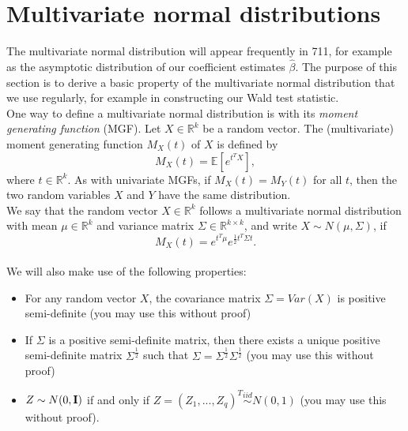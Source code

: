 \documentclass[11pt]{article}
\begin{document}
\section*{Multivariate normal distributions}

\noindent The multivariate normal distribution will appear frequently in 711, for example as the asymptotic distribution of our coefficient estimates $\widehat{\beta}$. The purpose of this section is to derive a basic property of the multivariate normal distribution that we use regularly, for example in constructing our Wald test statistic.\\


\noindent One way to define a multivariate normal distribution is with its \textit{moment generating function} (MGF).  Let $X \in \mathbb{R}^k$ be a random vector. The (multivariate) moment generating function $M_X(t)$ of $X$ is defined by
$$M_X(t) = \mathbb{E}[e^{t^T X}],$$
where $t \in \mathbb{R}^k$. As with univariate MGFs, if $M_X(t) = M_Y(t)$ for all $t$, then the two random variables $X$ and $Y$ have the same distribution.\\

\noindent We say that the random vector $X \in \mathbb{R}^k$ follows a multivariate normal distribution with mean $\mu \in \mathbb{R}^k$ and variance matrix $\Sigma \in \mathbb{R}^{k \times k}$, and write $X \sim N(\mu, \Sigma)$, if 
$$M_X(t) = e^{t^T \mu} e^{\frac{1}{2} t^T \Sigma t}.$$\\

\noindent We will also make use of the following properties:

\begin{itemize}

\item For any random vector $X$, the covariance matrix $\Sigma = Var(X)$ is positive semi-definite (you may use this without proof)

\item If $\Sigma$ is a positive semi-definite matrix, then there exists a unique positive semi-definite matrix $\Sigma^{\frac{1}{2}}$ such that $\Sigma = \Sigma^{\frac{1}{2}} \Sigma^{\frac{1}{2}}$ (you may use this without proof)

\item $Z \sim N(0, {\bf I})$ if and only if $Z = (Z_1,...,Z_q)^T \overset{iid}{\sim} N(0, 1)$ (you may use this without proof).

\end{itemize}
\end{document}
